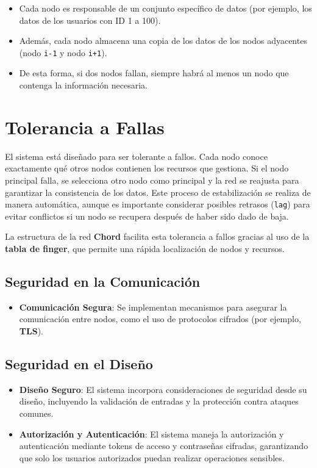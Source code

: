 \documentclass{article}
\begin{document}
\begin{itemize}
    \item Cada nodo es responsable de un conjunto específico de datos (por ejemplo, los datos de los usuarios con ID 1 a 100).
    \item Además, cada nodo almacena una copia de los datos de los nodos adyacentes (nodo \texttt{i-1} y nodo \texttt{i+1}).
    \item De esta forma, si dos nodos fallan, siempre habrá al menos un nodo que contenga la información necesaria.
\end{itemize}

\section{Tolerancia a Fallas}

El sistema está diseñado para ser tolerante a fallos. Cada nodo conoce exactamente qué otros nodos contienen los recursos que gestiona. Si el nodo principal falla, se selecciona otro nodo como principal y la red se reajusta para garantizar la consistencia de los datos. Este proceso de estabilización se realiza de manera automática, aunque es importante considerar posibles retrasos (\texttt{lag}) para evitar conflictos si un nodo se recupera después de haber sido dado de baja.

La estructura de la red \textbf{Chord} facilita esta tolerancia a fallos gracias al uso de la \textbf{tabla de finger}, que permite una rápida localización de nodos y recursos.

\subsection{Seguridad en la Comunicación}

\begin{itemize}
    \item \textbf{Comunicación Segura}: Se implementan mecanismos para asegurar la comunicación entre nodos, como el uso de protocolos cifrados (por ejemplo, \textbf{TLS}).
\end{itemize}

\subsection{Seguridad en el Diseño}

\begin{itemize}
    \item \textbf{Diseño Seguro}: El sistema incorpora consideraciones de seguridad desde su diseño, incluyendo la validación de entradas y la protección contra ataques comunes.
    \item \textbf{Autorización y Autenticación}: El sistema maneja la autorización y autenticación mediante tokens de acceso y contraseñas cifradas, garantizando que solo los usuarios autorizados puedan realizar operaciones sensibles.
\end{itemize}
\end{document}
